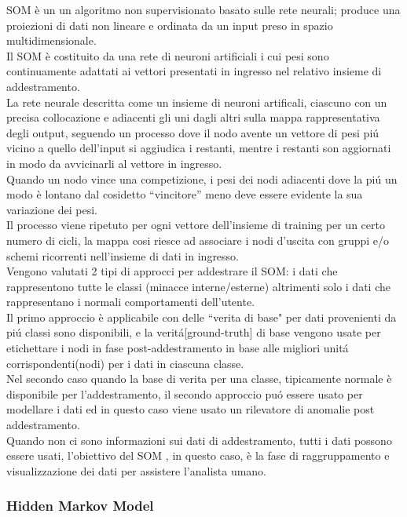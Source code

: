\documentclass[../tesi.tex]{subfiles}
\begin{document}
SOM è un un algoritmo non supervisionato basato sulle rete neurali; produce una proiezioni di dati non lineare e ordinata da un input preso in spazio multidimensionale.\\
Il SOM è costituito da una rete di neuroni artificiali i cui pesi sono continuamente adattati ai vettori presentati in ingresso nel relativo insieme di addestramento.\\
La rete neurale descritta come un insieme di neuroni artificali, ciascuno con un precisa collocazione e adiacenti gli uni dagli altri sulla mappa rappresentativa degli output, seguendo un processo dove il nodo avente un vettore di pesi piú vicino a quello dell’input si aggiudica i restanti, mentre i restanti son aggiornati in modo da avvicinarli al vettore in ingresso.\\
Quando un nodo vince una competizione, i pesi dei nodi adiacenti dove la piú un modo è lontano dal cosidetto “vincitore” meno deve essere evidente la sua variazione dei pesi.\\
Il processo viene ripetuto per ogni vettore dell’insieme di training per un certo numero di cicli, la mappa cosi riesce ad associare i nodi d’uscita con gruppi e/o schemi ricorrenti nell’insieme di dati in ingresso.\\
Vengono valutati 2 tipi di approcci per addestrare il SOM: i dati che rappresentono tutte le classi (minacce interne/esterne) altrimenti solo i dati che rappresentano i normali comportamenti dell’utente.\\
Il primo approccio è applicabile con delle ``verita di base" per dati provenienti da piú classi sono disponibili, e la veritá[ground-truth] di base vengono usate per etichettare i nodi in fase post-addestramento in base alle migliori unitá corrispondenti(nodi) per i dati in ciascuna classe.\\
Nel secondo caso quando la base di verita per una classe, tipicamente normale è disponibile per l’addestramento, il secondo approccio puó essere usato per modellare i dati ed in questo caso viene usato un rilevatore di anomalie post addestramento.\\
Quando non ci sono informazioni sui dati di addestramento, tutti i dati possono essere usati, l’obiettivo del SOM , in questo caso, è la fase di raggruppamento e visualizzazione dei dati per assistere l’analista umano.

\subsubsection{Hidden Markov Model}
\end{document}
